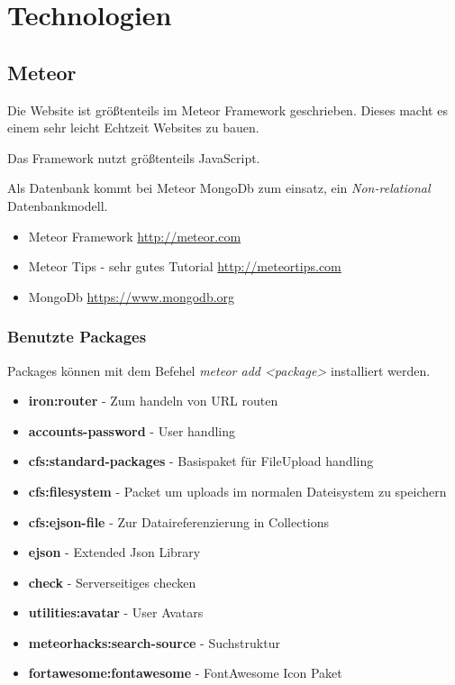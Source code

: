 \documentclass[Info_VK_Website_Dokumentation.tex]{subfiles}
\begin{document}
	
\chapter{Technologien}

\section{Meteor} 

Die Website ist größtenteils im Meteor Framework geschrieben. Dieses macht es einem sehr leicht Echtzeit Websites zu bauen.

Das Framework nutzt größtenteils JavaScript.

Als Datenbank kommt bei Meteor MongoDb zum einsatz, ein \emph{Non-relational} Datenbankmodell.

\begin{itemize}
 	\item Meteor Framework \url{http://meteor.com} \\
 	\item Meteor Tips - sehr gutes Tutorial \url{http://meteortips.com} \\
 	\item MongoDb \url{https://www.mongodb.org} \\ 
\end{itemize} 

\subsection{Benutzte Packages}

Packages können mit dem Befehel \emph{meteor add <package>} installiert werden.

\begin{itemize}
 	\item \textbf{iron:router} - Zum handeln von URL routen \\
 	\item \textbf{accounts-password} - User handling \\
 	\item \textbf{cfs:standard-packages} - Basispaket für FileUpload handling \\
 	\item \textbf{cfs:filesystem} - Packet um uploads im normalen Dateisystem zu speichern \\
 	\item \textbf{cfs:ejson-file} - Zur Dataireferenzierung in Collections \\
 	\item \textbf{ejson} - Extended Json Library \\
 	\item \textbf{check} - Serverseitiges checken \\
 	\item \textbf{utilities:avatar} - User Avatars \\
 	\item \textbf{meteorhacks:search-source} - Suchstruktur \\
 	\item \textbf{fortawesome:fontawesome} - FontAwesome Icon Paket \\
 \end{itemize} 
\end{document}
